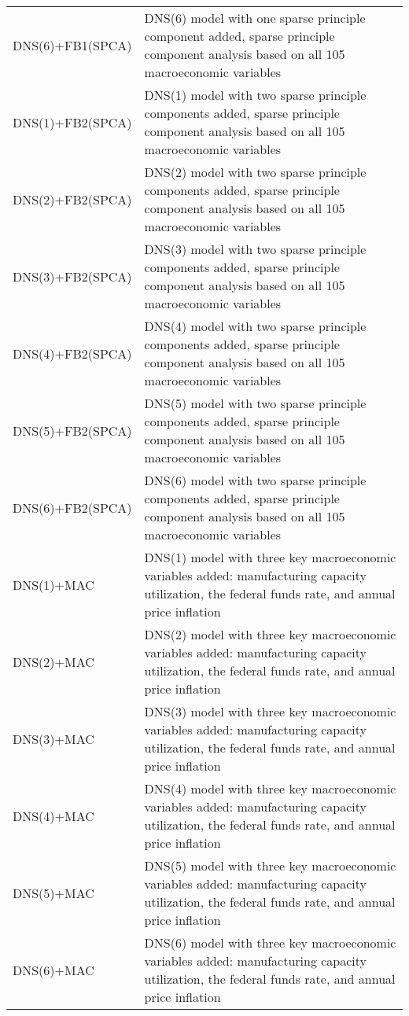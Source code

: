 \begin{footnotesize}
\begin{tabularx}{\linewidth}{lX}
DNS(6)+FB1(SPCA)          & DNS(6) model with one sparse principle component added, sparse principle component analysis based on all 105 macroeconomic variables \\
DNS(1)+FB2(SPCA)          & DNS(1) model with two sparse principle components added, sparse principle component analysis based on all 105 macroeconomic variables \\
DNS(2)+FB2(SPCA)          & DNS(2) model with two sparse principle components added, sparse principle component analysis based on all 105 macroeconomic variables \\
DNS(3)+FB2(SPCA)          & DNS(3) model with two sparse principle components added, sparse principle component analysis based on all 105 macroeconomic variables \\
DNS(4)+FB2(SPCA)          & DNS(4) model with two sparse principle components added, sparse principle component analysis based on all 105 macroeconomic variables \\
DNS(5)+FB2(SPCA)          & DNS(5) model with two sparse principle components added, sparse principle component analysis based on all 105 macroeconomic variables \\
DNS(6)+FB2(SPCA)          & DNS(6) model with two sparse principle components added, sparse principle component analysis based on all 105 macroeconomic variables \\
DNS(1)+MAC                & DNS(1) model with three key macroeconomic variables added: manufacturing capacity utilization, the federal funds rate, and annual price inflation \\
DNS(2)+MAC                & DNS(2) model with three key macroeconomic variables added: manufacturing capacity utilization, the federal funds rate, and annual price inflation \\
DNS(3)+MAC                & DNS(3) model with three key macroeconomic variables added: manufacturing capacity utilization, the federal funds rate, and annual price inflation \\
DNS(4)+MAC                & DNS(4) model with three key macroeconomic variables added: manufacturing capacity utilization, the federal funds rate, and annual price inflation \\
DNS(5)+MAC                & DNS(5) model with three key macroeconomic variables added: manufacturing capacity utilization, the federal funds rate, and annual price inflation \\
DNS(6)+MAC                & DNS(6) model with three key macroeconomic variables added: manufacturing capacity utilization, the federal funds rate, and annual price inflation

\end{tabularx}
\end{footnotesize}
